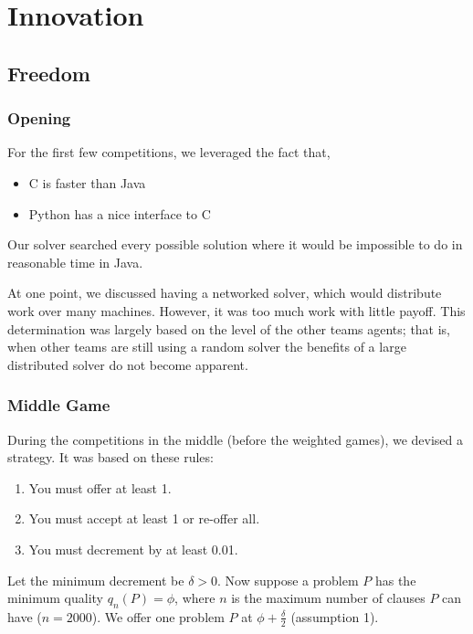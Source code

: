 \documentclass[letterpaper,12pt,oneside]{article}
\begin{document}
\section{Innovation}

\setcounter{subsection}{-1}
\setcounter{subsubsection}{-1}
\subsection{Freedom}

\subsubsection{Opening}
For the first few competitions, we leveraged the fact that,
\begin{itemize}
\item C is faster than Java
\item Python has a nice interface to C
\end{itemize}
Our solver searched every possible solution where it would be impossible to
do in reasonable time in Java.

At one point, we discussed having a networked solver, which would
distribute work over many machines. However, it was too much work with
little payoff. This determination was largely based on the level of the other
teams agents; that is, when other teams are still using a random solver the
benefits of a large distributed solver do not become apparent.

\subsubsection{Middle Game} \label{Middle Game}

During the competitions in the middle (before the weighted games), we
devised a strategy. It was based on these rules:
\begin{enumerate}
\item You must offer at least 1.
\item You must accept at least 1 or re-offer all.
\item You must decrement by at least 0.01.
\end{enumerate}

Let the minimum decrement be $\delta > 0$.
Now suppose a problem $P$ has the minimum quality $q_n(P) = \phi$, where $n$
is the maximum number of clauses $P$ can have ($n = 2000$).
We offer one problem $P$ at $\phi + \frac{\delta}{2}$ (assumption 1).
\end{document}
